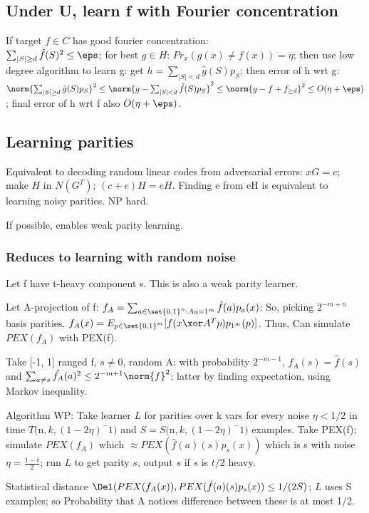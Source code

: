\documentclass[oneside, article]{memoir}
\begin{document}
\subsection{Under U, learn f with Fourier concentration}
If target $f \in C$ has good fourier concentration: \\
$\sum_{|S|\geq d} \hat{f}(S)^{2} \leq \eps$; for best $g \in H$: $Pr_{x}(g(x)\neq f(x)) = \eta$; then use low degree algorithm to learn g: get $h = \sum_{|S|< d} \hat{g}(S)p_{S}$; then error of h wrt g:\\
 $\norm{\sum_{|S|\geq d} \hat{g}(S)p_{S}}^{2} \leq \norm{g-\sum_{|S|<d}\hat{f}(S)p_{S}}^{2} \leq \norm{g - f + f_{\geq d}}^{2} \leq O(\eta + \eps)$; final error of h wrt f also $O(\eta + \eps)$.

\subsection{Learning parities}
Equivalent to decoding random linear codes from adversarial errors: $xG = c$; make $H$ in $N(G^T)$; $(c+e)H = eH$. Finding e from eH is equivalent to learning noisy parities. NP hard.

If possible, enables weak parity learning.

\subsubsection{Reduces to learning with random noise}
Let f have t-heavy component s. This is also a weak parity learner.

Let A-projection of f: $f_A = \sum_{a \in \set{0, 1}^n: Aa = 1^m} \hat{f}(a)p_a(x)$: So, picking $2^{-m+n}$ basis parities. $f_A(x) = E_{p \in \set{0,1}^m}[f(x \xor A^T p)p_{1^m}(p)]$. Thus, Can simulate $PEX(f_A)$ with PEX(f).

Take [-1, 1] ranged f, $s \neq 0$, random A: with probability $2^{-m-1}$, $\hat{f}_A(s) = \hat{f}(s)$ and $\sum_{a \neq s}\hat{f_A}(a)^2 \leq 2^{-m+1} \norm{f}^2$: latter by finding expectation, using Markov inequality.

Algorithm WP: Take learner $L$ for parities over k vars for every noise $\eta < 1/2$ in time $T($n$,k, (1-2\eta)^-1)$ and $S = S($n$,k, (1-2\eta)^-1)$ examples. Take PEX(f); simulate $PEX(f_A)$ which $\approx PEX(\hat{f}(a)(s)p_s(x))$ which is s with noise $\eta = \frac{1-t}{2}$; run $L$ to get parity $s$, output $s$ if $s$ is $t/2$ heavy.

Statistical distance $\Del(PEX(f_A(x)), PEX(\hat{f}(a)(s)p_s(x))\leq 1/(2S)$; $L$ uses S examples; so Probability that A notices difference between these is at most 1/2.
\end{document}
